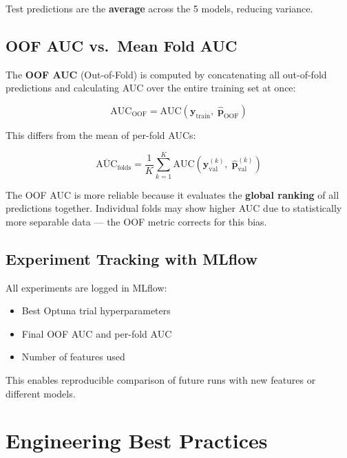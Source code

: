 \documentclass[12pt, a4paper]{article}
\begin{document}
Test predictions are the \textbf{average} across the 5 models, reducing variance.

\subsection{OOF AUC vs.\ Mean Fold AUC}

The \textbf{OOF AUC} (Out-of-Fold) is computed by concatenating all out-of-fold
predictions and calculating AUC over the entire training set at once:

\begin{equation}
    \text{AUC}_{\text{OOF}} = \text{AUC}\!\left(\mathbf{y}_{\text{train}},\;
    \hat{\mathbf{p}}_{\text{OOF}}\right)
\end{equation}

This differs from the mean of per-fold AUCs:

\begin{equation}
    \overline{\text{AUC}}_{\text{folds}} = \frac{1}{K}
    \sum_{k=1}^{K} \text{AUC}\!\left(\mathbf{y}^{(k)}_{\text{val}},\;
    \hat{\mathbf{p}}^{(k)}_{\text{val}}\right)
\end{equation}

The OOF AUC is more reliable because it evaluates the \textbf{global ranking} of all
predictions together. Individual folds may show higher AUC due to statistically more
separable data --- the OOF metric corrects for this bias.

\subsection{Experiment Tracking with MLflow}

All experiments are logged in MLflow:
\begin{itemize}
    \item Best Optuna trial hyperparameters
    \item Final OOF AUC and per-fold AUC
    \item Number of features used
\end{itemize}

This enables reproducible comparison of future runs with new features or different models.

\section{Engineering Best Practices}
\end{document}
